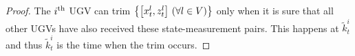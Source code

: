 	\begin{proof}
		The $i^\text{th}$ UGV can trim $\left\lbrace\left[x^l_t,z^l_t\right] \,(\forall l\in V)\right\rbrace$ only when it is sure that all other UGVs have also received these state-measurement pairs.
		This happens at $\tilde{k}^i_t$ and thus $\tilde{k}^i_t$ is the time when the trim occurs. 
		
		
		
	\end{proof}
	
	
%	
	
